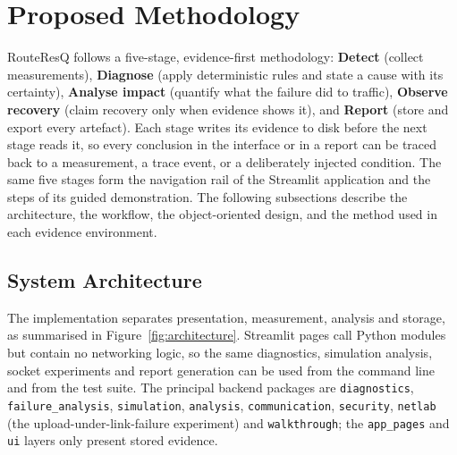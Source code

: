 \documentclass[12pt,a4paper]{report}
\numberwithin{equation}{chapter}
\begin{document}
\section{Proposed Methodology}
RouteResQ follows a five-stage, evidence-first methodology: \textbf{Detect} (collect measurements), \textbf{Diagnose} (apply deterministic rules and state a cause with its certainty), \textbf{Analyse impact} (quantify what the failure did to traffic), \textbf{Observe recovery} (claim recovery only when evidence shows it), and \textbf{Report} (store and export every artefact). Each stage writes its evidence to disk before the next stage reads it, so every conclusion in the interface or in a report can be traced back to a measurement, a trace event, or a deliberately injected condition. The same five stages form the navigation rail of the Streamlit application and the steps of its guided demonstration. The following subsections describe the architecture, the workflow, the object-oriented design, and the method used in each evidence environment.

\subsection{System Architecture}
The implementation separates presentation, measurement, analysis and storage, as summarised in Figure~\ref{fig:architecture}. Streamlit pages call Python modules but contain no networking logic, so the same diagnostics, simulation analysis, socket experiments and report generation can be used from the command line and from the test suite. The principal backend packages are \texttt{diagnostics}, \texttt{failure\_analysis}, \texttt{simulation}, \texttt{analysis}, \texttt{communication}, \texttt{security}, \texttt{netlab} (the upload-under-link-failure experiment) and \texttt{walkthrough}; the \texttt{app\_pages} and \texttt{ui} layers only present stored evidence.
\end{document}
